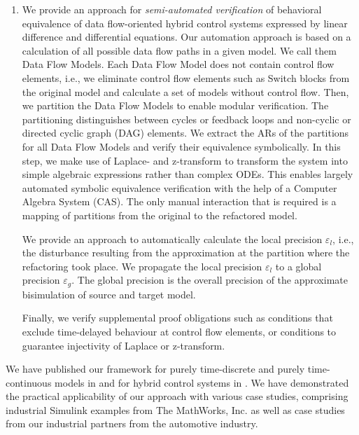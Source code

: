 \documentclass[conference]{IEEEtran}
\begin{document}
\begin{enumerate}[itemsep=0pt]
\item We provide an approach for \emph{semi-automated verification} of behavioral equivalence of data flow-oriented hybrid control systems expressed by linear difference and differential equations. Our automation approach is %
based on a calculation of all possible data flow paths in a given model. We call them Data Flow Models. Each Data Flow Model does not contain control flow elements, i.e., we eliminate control flow elements such as Switch blocks from the original model and calculate a set of models without control flow. 
Then, we partition the Data Flow Models to enable modular verification. The partitioning distinguishes between cycles or feedback loops and non-cyclic or directed cyclic graph (DAG) elements. %
We extract the ARs of the partitions for all Data Flow Models and verify their equivalence symbolically. In this step, we make use of Laplace- and z-transform to transform the system into simple algebraic expressions rather than complex ODEs. This enables largely automated symbolic equivalence verification with the help of a Computer Algebra System (CAS). The only manual interaction that is required is a mapping of partitions from the original to the refactored model. %

We provide an approach to automatically calculate the local precision $\varepsilon_l$, i.e., the disturbance resulting from the approximation at the partition where the refactoring took place. 
We propagate the local precision $\varepsilon_l$ to a global precision $\varepsilon_g$. The global precision is the overall precision of the approximate bisimulation of source and target model. %

Finally, we verify supplemental proof obligations such as conditions that exclude time-delayed behaviour at control flow elements, or conditions to guarantee injectivity of Laplace or z-transform. 
\end{enumerate}
We have published our framework for purely time-discrete and purely time-continuous models in \cite{Schlesinger.2015,Schlesinger.2016} and for hybrid control systems in \cite{Schlesinger.CyPhy}. 
We have demonstrated the practical applicability of our approach with various case studies, comprising industrial Simulink examples from The MathWorks, Inc. as well as case studies from our industrial partners from the automotive industry.
\end{document}
